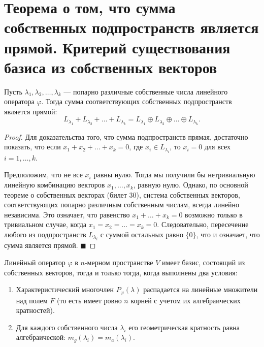 \section{Теорема о том, что сумма собственных подпространств является прямой. Критерий существования базиса из собственных векторов}

\begin{theorem}
Пусть $\lambda_1, \lambda_2, \dots, \lambda_k$ --- попарно различные собственные числа линейного оператора $\varphi$. Тогда сумма соответствующих собственных подпространств является прямой:
\[
L_{\lambda_1} + L_{\lambda_2} + \dots + L_{\lambda_k} = L_{\lambda_1} \oplus L_{\lambda_2} \oplus \dots \oplus L_{\lambda_k}.
\]
\end{theorem}

\begin{proof}
Для доказательства того, что сумма подпространств прямая, достаточно показать, что если $x_1 + x_2 + \dots + x_k = 0$, где $x_i \in L_{\lambda_i}$, то $x_i = 0$ для всех $i = 1, \dots, k$.

Предположим, что не все $x_i$ равны нулю. Тогда мы получили бы нетривиальную линейную комбинацию векторов $x_1, \dots, x_k$, равную нулю. Однако, по основной теореме о собственных векторах (билет 30), система собственных векторов, соответствующих попарно различным собственным числам, всегда линейно независима. 
Это означает, что равенство $x_1 + \dots + x_k = 0$ возможно только в тривиальном случае, когда $x_1 = x_2 = \dots = x_k = 0$. 
Следовательно, пересечение любого из подпространств $L_{\lambda_i}$ с суммой остальных равно $\{0\}$, что и означает, что сумма является прямой.
\hfill$\blacksquare$
\end{proof}

\begin{theorem}
Линейный оператор $\varphi$ в $n$-мерном пространстве $V$ имеет базис, состоящий из собственных векторов, тогда и только тогда, когда выполнены два условия:
\begin{enumerate}
    \item Характеристический многочлен $P_\varphi(\lambda)$ распадается на линейные множители над полем $F$ (то есть имеет ровно $n$ корней с учетом их алгебраических кратностей).
    \item Для каждого собственного числа $\lambda_i$ его геометрическая кратность равна алгебраической: $m_g(\lambda_i) = m_a(\lambda_i)$.
\end{enumerate}
\end{theorem}

